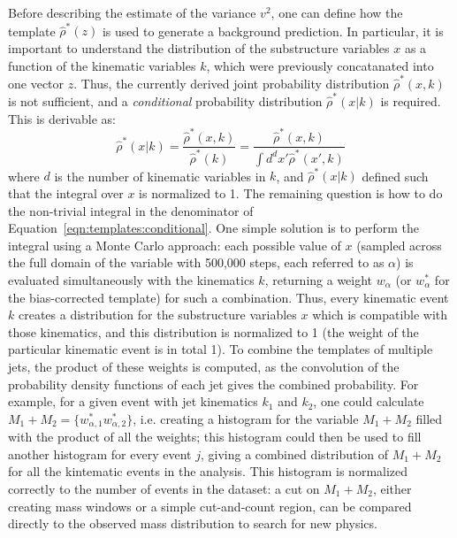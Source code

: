 Before describing the estimate of the variance $v^2$, one can define how the template $\hat{\rho}^*(z)$ is used to generate a background prediction. In particular, it is important to understand the distribution of the substructure variables $x$ as a function of the kinematic variables $k$, which were previously concatanated into one vector $z$. Thus, the currently derived joint probability distribution $\hat{\rho}^*(x,k)$ is not sufficient, and a \textit{conditional} probability distribution $\hat{\rho}^*(x|k)$ is required. This is derivable as:
%
\begin{equation}
\label{eqn:templates:conditional}
\hat{\rho}^*(x|k) = \frac{\hat{\rho}^*(x,k)}{\hat{\rho}^*(k)} = \frac{\hat{\rho}^*(x,k)}{\int d^d x' \hat{\rho}^*(x',k)} 
\end{equation}
%
where $d$ is the number of kinematic variables in $k$, and $\hat{\rho}^*(x|k)$ defined such that the integral over $x$ is normalized to 1. The remaining question is how to do the non-trivial integral in the denominator of Equation~\ref{eqn:templates:conditional}. One simple solution is to perform the integral using a Monte Carlo approach: each possible value of $x$ (sampled across the full domain of the variable with 500,000 steps, each referred to as $\alpha$) is evaluated simultaneously with the kinematics $k$, returning a weight $w_\alpha$ (or $w^*_\alpha$ for the bias-corrected template) for such a combination. Thus, every kinematic event $k$ creates a distribution for the substructure variables $x$ which is compatible with those kinematics, and this distribution is normalized to 1 (the weight of the particular kinematic event is in total 1). To combine the templates of multiple jets, the product of these weights is computed, as the convolution of the probability density functions of each jet gives the combined probability. For example, for a given event with jet kinematics $k_1$ and $k_2$, one could calculate $M_1 + M_2 = \{w^*_{\alpha,1} w^*_{\alpha,2}\}$, i.e. creating a histogram for the variable $M_1 + M_2$ filled with the product of all the weights; this histogram could then be used to fill another histogram for every event $j$, giving a combined distribution of $M_1 + M_2$ for all the kintematic events in the analysis. This histogram is normalized correctly to the number of events in the dataset: a cut on $M_1 + M_2$, either creating mass windows or a simple cut-and-count region, can be compared directly to the observed mass distribution to search for new physics.

